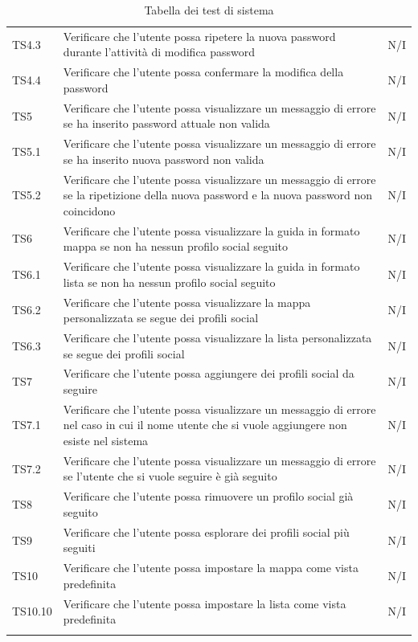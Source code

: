 {\begin{longtable}{C{.3\freewidth} C{.5\freewidth} C{.3\freewidth}}
    TS4.3 & Verificare che l'utente possa ripetere la nuova password durante l'attività di modifica password& N/I  \\
    TS4.4 & Verificare che l'utente possa confermare la modifica della password & N/I  \\
    TS5 & Verificare che l'utente possa visualizzare un messaggio di errore se ha inserito password attuale  non valida & N/I  \\
    TS5.1 & Verificare che l'utente possa visualizzare un messaggio di errore se ha inserito nuova password non valida & N/I  \\
    TS5.2 & Verificare che l'utente possa visualizzare un messaggio di errore se la ripetizione della nuova password e la nuova password non coincidono & N/I  \\
    TS6 & Verificare che l'utente possa visualizzare la guida in formato mappa se non ha nessun profilo social seguito & N/I  \\
    TS6.1 & Verificare che l'utente possa visualizzare la guida in formato lista se non ha nessun profilo social seguito & N/I  \\
    TS6.2 & Verificare che l'utente possa visualizzare la mappa personalizzata se segue dei profili social & N/I  \\
    TS6.3 & Verificare che l'utente possa visualizzare la lista personalizzata se segue dei profili social & N/I  \\
    TS7 & Verificare che l'utente possa aggiungere dei profili social da seguire & N/I  \\
    TS7.1 & Verificare che l'utente possa visualizzare un messaggio di errore nel caso in cui il nome utente che si vuole aggiungere non esiste nel sistema & N/I  \\
    TS7.2 & Verificare che l'utente possa visualizzare un messaggio di errore se l'utente che si vuole seguire è già seguito & N/I  \\
    TS8 & Verificare che l'utente possa rimuovere un profilo social già seguito & N/I  \\
    TS9 & Verificare che l'utente possa esplorare dei profili social più seguiti & N/I  \\
    TS10 & Verificare che l'utente possa impostare  la mappa come vista predefinita & N/I  \\
    TS10.10 & Verificare che l'utente possa impostare  la lista come vista predefinita & N/I  \\
    \bottomrule
    \caption{Tabella dei test di sistema}
\end{longtable}
    
}
